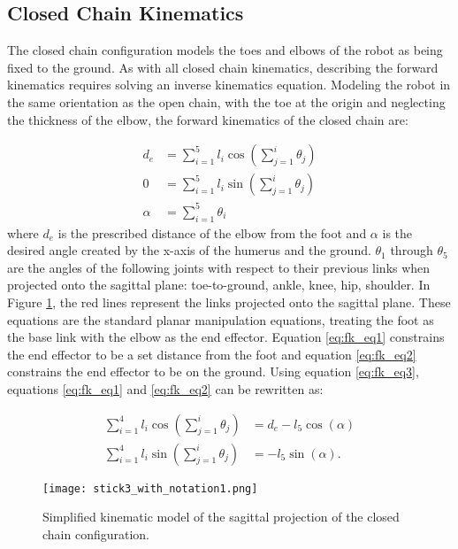 \subsection{Closed Chain Kinematics}

The closed chain configuration models the toes and elbows of the robot as being fixed to the ground.
As with all closed chain kinematics, describing the forward kinematics requires solving an inverse
kinematics equation. Modeling the robot in the same orientation as the open chain, with the toe at the origin
and neglecting the thickness of the elbow,
the forward kinematics of the closed chain are:

\begin{align}
	d_e &= \sum_{i=1}^5 l_i \cos(\sum_{j=1}^i \theta_j) \label{eq:fk_eq1}\\
	0 &= \sum_{i=1}^5 l_i \sin(\sum_{j=1}^i \theta_j) \label{eq:fk_eq2} \\
	\alpha &=\sum_{i=1}^5 \theta_i \label{eq:fk_eq3}
\end{align}
where $d_e$ is the prescribed distance of the elbow from the foot and $\alpha$ is the desired angle
created by the x-axis of the humerus and the ground.
$\theta_1$ through $\theta_5$ are the angles of the following joints with respect to their previous links when projected onto the sagittal plane:
toe-to-ground, ankle, knee, hip, shoulder. In Figure \ref{fig:pp_stick1}, the red lines represent the links projected onto the sagittal plane.
These equations are the standard planar manipulation equations, treating the foot as the base link 
with the elbow as the end effector.
Equation \ref{eq:fk_eq1} constrains the end effector to be a set distance from the foot and 
equation \ref{eq:fk_eq2} constrains the end effector to be on the ground.
Using equation \ref{eq:fk_eq3}, equations \ref{eq:fk_eq1} and \ref{eq:fk_eq2} can be rewritten as:

\begin{align}
\sum_{i=1}^4 l_i \cos(\sum_{j=1}^i \theta_j) &= d_e - l_5 \cos(\alpha) \label{eq:sum_cos1} \\
\sum_{i=1}^4 l_i \sin(\sum_{j=1}^i \theta_j) &= - l_5 \sin(\alpha). \label{eq:sum_sin1}
\end{align}

\begin{figure}
	\centering
	\texttt{[image: stick3\_with\_notation1.png]}
	\caption
	{Simplified kinematic model of the sagittal projection of the closed chain configuration.}
	\label{fig:pp_stick1}
\end{figure}

